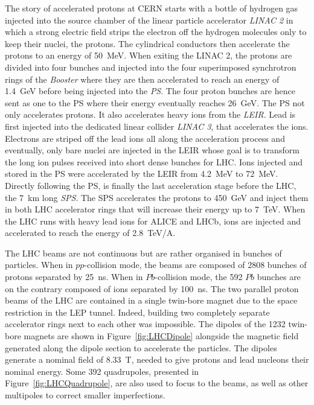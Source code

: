 	The story of accelerated protons at CERN starts with a bottle of hydrogen gas injected into the source chamber of the linear particle accelerator \textit{LINAC 2} in which a strong electric field strips the electron off the hydrogen molecules only to keep their nuclei, the protons. The cylindrical conductors then accelerate the protons to an energy of \SI{50}{MeV}.
	When exiting the LINAC 2, the protons are divided into four bunches and injected into the four superimposed synchrotron rings of the \textit{Booster} where they are then accelerated to reach an energy of \SI{1.4}{GeV} before being injected into the \textit{PS}.
	The four proton bunches are hence sent as one to the PS where their energy eventually reaches \SI{26}{GeV}. The PS not only accelerates protons. It also accelerates heavy ions from the \textit{\acf{LEIR}}. Lead is first injected into the dedicated linear collider \textit{LINAC 3}, that accelerates the ions. Electrons are striped off the lead ions all along the acceleration process and eventually, only bare nuclei are injected in the LEIR whose goal is to transform the long ion pulses received into short dense bunches for LHC. Ions injected and stored in the PS were accelerated by the LEIR from \SI{4.2}{MeV} to \SI{72}{MeV}.
	Directly following the PS, is finally the last acceleration stage before the LHC, the \SI{7}{km} long \textit{SPS}. The SPS accelerates the protons to \SI{450}{GeV} and inject them in both LHC accelerator rings that will increase their energy up to \SI{7}{TeV}. When the LHC runs with heavy lead ions for ALICE and LHCb, ions are injected and accelerated to reach the energy of \SI{2.8}{TeV/A}.
	
	The LHC beams are not continuous but are rather organised in bunches of particles. When in $pp$-collision mode, the beams are composed of 2808 bunches of  protons separated by \SI{25}{ns}. When in $Pb$-collision mode, the 592 $Pb$ bunches are on the contrary composed of  ions separated by \SI{100}{ns}. The two parallel proton beams of the LHC are contained in a single twin-bore magnet due to the space restriction in the LEP tunnel. Indeed, building two completely separate accelerator rings next to each other was impossible. The dipoles of the 1232 twin-bore magnets are shown in Figure~\ref{fig:LHCDipole} alongside the magnetic field generated along the dipole section to accelerate the particles. The dipoles generate a nominal field of \SI{8.33}{T}, needed to give protons and lead nucleons their nominal energy. Some 392 quadrupoles, presented in Figure~\ref{fig:LHCQuadrupole}, are also used to focus to the beams, as well as other multipoles to correct smaller imperfections.
	
